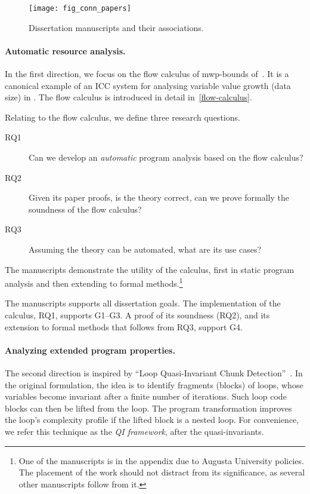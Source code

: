 \begin{figure}[p]
\texttt{[image: fig\_conn\_papers]}\vspace{1em}
\caption[Dissertation manuscripts and their associations]
{Dissertation manuscripts and their associations.}
\label{fig:conn_papers}
\end{figure}

\paragraph*{Automatic resource analysis.}

In the first direction, we focus on the flow calculus of mwp-bounds
of~\textcite{jones2009}. It is a canonical example of an ICC system for
analysing variable value growth (data size) in . The
flow calculus is introduced in detail in~\autoref{flow-calculus}.

Relating to the flow calculus, we define three research questions.
\begin{description}
\item[RQ1] Can we develop an \emph{automatic} program analysis based on the flow
calculus?
\item[RQ2] Given its paper proofs, is the theory correct, \ie can we prove
formally the soundness of the flow calculus?
\item[RQ3] Assuming the theory can be automated, what are its use cases?
\end{description}

The manuscripts demonstrate the utility of the calculus, first in static program
analysis and then extending to formal methods.\footnote{ One of the manuscripts
is in the appendix due to Augusta University policies. The placement of the work
should not distract from its significance, as several other manuscripts follow
from it.}

The manuscripts supports all dissertation goals. The implementation of the
calculus, RQ1, supports G1--G3. A proof of its soundness (RQ2), and its
extension to formal methods that follows from RQ3, support G4.

\paragraph*{Analyzing extended program properties.}

The second direction is inspired by \enquote{Loop Quasi-Invariant Chunk
Detection}~\cite{moyen20172}. In the original formulation, the idea is to
identify fragments (blocks) of loops, whose variables become invariant after a
finite number of iterations. Such loop  code blocks can
then be lifted from the loop. The program transformation improves the loop's
complexity profile if the lifted block is a nested loop. For convenience, we
refer this technique as the \emph{QI framework}, after the quasi-invariants.


